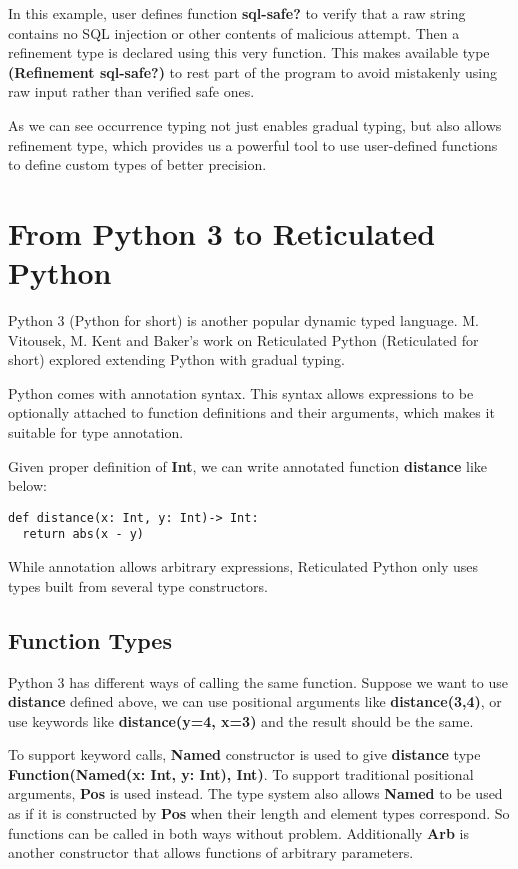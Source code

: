 In this example, user defines function \textbf{sql-safe?} to verify
that a raw string contains no SQL injection or other contents of malicious attempt.
Then a refinement type is declared using this very function.
This makes available type \textbf{(Refinement sql-safe?)} to rest part of the program
to avoid mistakenly using raw input rather than verified safe ones.

As we can see occurrence typing not just enables
gradual typing, but also allows refinement type,
which provides us a powerful tool to use user-defined functions
to define custom types of better precision.

\section{From Python 3 to Reticulated Python}

Python 3 (Python for short) is another popular dynamic typed language.
M. Vitousek, M. Kent and Baker's work on Reticulated Python (Reticulated for short)
explored extending Python with gradual typing.

Python comes with annotation syntax.
This syntax allows expressions to be optionally attached to
function definitions and their arguments,
which makes it suitable for type annotation.

Given proper definition of \textbf{Int}, we can write annotated
function \textbf{distance} like below:

\begin{verbatim}
def distance(x: Int, y: Int)-> Int:
  return abs(x - y)
\end{verbatim}

While annotation allows arbitrary expressions, Reticulated Python
only uses types built from several type constructors.

\subsection{Function Types}

Python 3 has different ways of calling the same function.
Suppose we want to use \textbf{distance} defined above,
we can use positional arguments like \textbf{distance(3,4)},
or use keywords like \textbf{distance(y=4, x=3)} and the result should be the same.

To support keyword calls, \textbf{Named} constructor is used to give
\textbf{distance} type \textbf{Function(Named(x: Int, y: Int), Int)}.
To support traditional positional arguments, \textbf{Pos} is used instead.
The type system also allows \textbf{Named} to be used as if it is constructed by \textbf{Pos}
when their length and element types correspond. So functions can be called in both
ways without problem. Additionally \textbf{Arb} is another constructor
that allows functions of arbitrary parameters.

